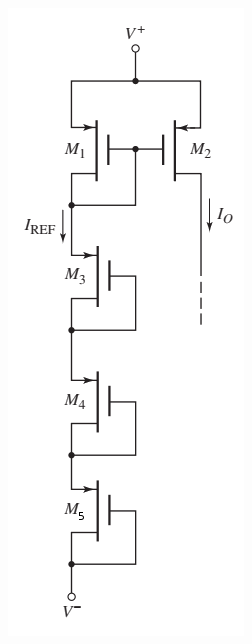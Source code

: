 \documentclass[12pt,letterpaper,titlepage]{article}
\begin{document}
\begin{raggedright}
\begin{paracol}{2}
\switchcolumn*
\begin{center}
\includegraphics[width=\textwidth, height=20\baselineskip, keepaspectratio=true]{ds2}
\end{center}
\switchcolumn

\end{paracol}
\end{raggedright}
\end{document}
